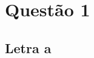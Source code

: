 \documentclass[12pt, a4paper]{article}
\begin{document}
% 

\section{Questão 1}
\subsection{Letra a}


\end{document}
